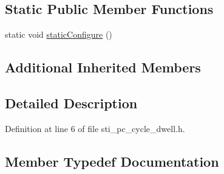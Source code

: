 \subsection*{Static Public Member Functions}
\begin{DoxyCompactItemize}
\item 
static void \hyperlink{structsm__respira__1_1_1pc__cycle__inner__states_1_1StiPCCycleDwell_a9320f3bf438cb417074efccfdd70abeb}{static\+Configure} ()
\end{DoxyCompactItemize}
\subsection*{Additional Inherited Members}


\subsection{Detailed Description}


Definition at line 6 of file sti\+\_\+pc\+\_\+cycle\+\_\+dwell.\+h.



\subsection{Member Typedef Documentation}
\mbox{\label{structsm__respira__1_1_1pc__cycle__inner__states_1_1StiPCCycleDwell_a70560279c411fb3963a3320257f938b5}} 

